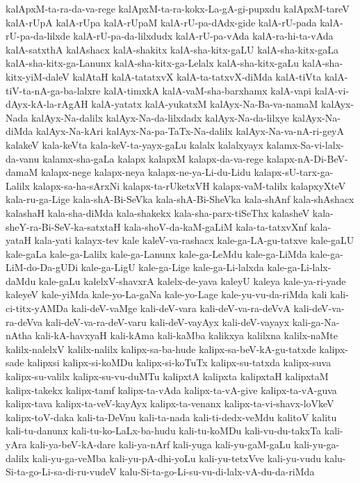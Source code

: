 {kalApxM-ta-ra-da-va-rege
kalApxM-ta-ra-kokx-La-gA-gi-pupxdu
kalApxM-tareV
kalA-rUpA
kalA-rUpa
kalA-rUpaM
kalA-rU-pa-dAdx-gide
kalA-rU-pada
kalA-rU-pa-da-lilxde
kalA-rU-pa-da-lilxdudx
kalA-rU-pa-vAda
kalA-ra-hi-ta-vAda
kalA-satxthA
kalAshacx
kalA-shakitx
kalA-sha-kitx-gaLU
kalA-sha-kitx-gaLa
kalA-sha-kitx-ga-Lanunx
kalA-sha-kitx-ga-Lelalx
kalA-sha-kitx-gaLu
kalA-sha-kitx-yiM-daleV
kalAtaH
kalA-tatatxvX
kalA-ta-tatxvX-diMda
kalA-tiVta
kalA-tiV-ta-nA-ga-ba-lalxre
kalA-timxkA
kalA-vaM-sha-barxhamx
kalA-vapi
kalA-vi-dAyx-kA-la-rAgAH
kalA-yatatx
kalA-yukatxM
kalAyx-Na-Ba-va-namaM
kalAyx-Nada
kalAyx-Na-dalilx
kalAyx-Na-da-lilxdadx
kalAyx-Na-da-lilxye
kalAyx-Na-diMda
kalAyx-Na-kAri
kalAyx-Na-pa-TaTx-Na-dalilx
kalAyx-Na-va-nA-ri-geyA
kalakeV
kala-keVta
kala-keV-ta-yayx-gaLu
kalalx
kalalxyayx
kalamx-Sa-vi-lalx-da-vanu
kalamx-sha-gaLa
kalapx
kalapxM
kalapx-da-va-rege
kalapx-nA-Di-BeV-damaM
kalapx-nege
kalapx-neya
kalapx-ne-ya-Li-du-Lidu
kalapx-sU-tarx-ga-Lalilx
kalapx-sa-ha-sArxNi
kalapx-ta-rUketxVH
kalapx-vaM-talilx
kalapxyXteV
kala-ru-ga-Lige
kala-shA-Bi-SeVka
kala-shA-Bi-SheVka
kala-shAnf
kala-shAshacx
kalashaH
kala-sha-diMda
kala-shakekx
kala-sha-parx-tiSeThx
kalasheV
kala-sheY-ra-Bi-SeV-ka-satxtaH
kala-shoV-da-kaM-gaLiM
kala-ta-tatxvXnf
kala-yataH
kala-yati
kalayx-tev
kale
kaleV-va-rashacx
kale-ga-LA-gu-tatxve
kale-gaLU
kale-gaLa
kale-ga-Lalilx
kale-ga-Lanunx
kale-ga-LeMdu
kale-ga-LiMda
kale-ga-LiM-do-Da-gUDi
kale-ga-LigU
kale-ga-Lige
kale-ga-Li-lalxda
kale-ga-Li-lalx-daMdu
kale-gaLu
kalelxV-shavxrA
kalelx-de-yava
kaleyU
kaleya
kale-ya-ri-yade
kaleyeV
kale-yiMda
kale-yo-La-gaNa
kale-yo-Lage
kale-yu-vu-da-riMda
kali
kali-ci-titx-yAMDa
kali-deV-vaMge
kali-deV-vara
kali-deV-va-ra-deVvA
kali-deV-va-ra-deVva
kali-deV-va-ra-deV-varu
kali-deV-vayAyx
kali-deV-vayayx
kali-ga-Na-nAtha
kali-kA-havxyaH
kali-kAma
kali-kaMba
kalikxya
kalilxna
kalilx-naMte
kalilx-nalelxV
kalilx-nalilx
kalipx-sa-ba-hude
kalipx-sa-beV-kA-gu-tatxde
kalipx-sade
kalipxsi
kalipx-si-koMDu
kalipx-si-koTuTx
kalipx-su-tatxda
kalipx-suva
kalipx-su-valilx
kalipx-su-vu-duMTu
kalipxtA
kalipxta
kalipxtaH
kalipxtaM
kalipx-takekx
kalipx-tamf
kalipx-ta-vAda
kalipx-ta-vA-give
kalipx-ta-vA-guva
kalipx-tava
kalipx-ta-veV-kayAyx
kalipx-ta-venanx
kalipx-ta-vi-shavx-loVkeV
kalipx-toV-daka
kali-ta-DeVnu
kali-ta-nada
kali-ti-dedx-veMdu
kalitoV
kalitu
kali-tu-danunx
kali-tu-ko-LaLx-ba-hudu
kali-tu-koMDu
kali-vu-du-takxTa
kali-yAra
kali-ya-beV-kA-dare
kali-ya-nArf
kali-yuga
kali-yu-gaM-gaLu
kali-yu-ga-dalilx
kali-yu-ga-veMba
kali-yu-pA-dhi-yoLu
kali-yu-tetxVve
kali-yu-vudu
kalu-Si-ta-go-Li-sa-di-ru-vudeV
kalu-Si-ta-go-Li-su-vu-di-lalx-vA-du-da-riMda
}
